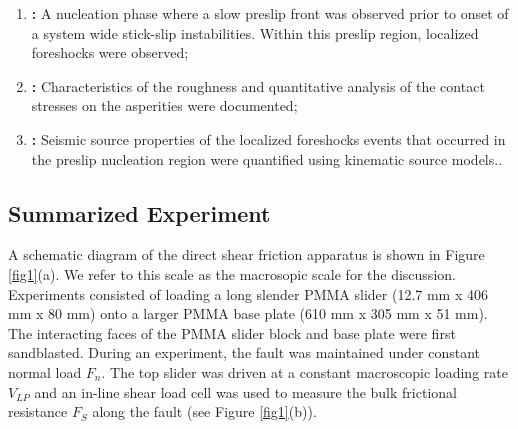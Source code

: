 \documentclass[preprint,1p, 10pt,authoryear]{elsarticle}
\begin{document}
\begin{enumerate}
\item \textbf{\citet{Selvadurai2015}: } A nucleation phase where a slow preslip front was observed prior to onset of a system wide stick-slip instabilities. Within this preslip region, localized foreshocks were observed;
\item \textbf{\citet{Selvadurai2017}:} Characteristics of the roughness and quantitative analysis of the contact stresses on the asperities were documented;
\item \textbf{\citet{Selvadurai2019}: }Seismic source properties of the localized foreshocks events that occurred in the preslip nucleation region were quantified using kinematic source models..
\end{enumerate}

\subsection{Summarized Experiment}
\label{GeneralExp}
A schematic diagram of the direct shear friction apparatus is shown in Figure \ref{fig1}(a). We refer to this scale as the macrosopic scale for the discussion. Experiments consisted of loading a long slender PMMA slider (12.7 mm x 406 mm x 80 mm) onto a larger PMMA base plate (610 mm x 305 mm x 51 mm). The interacting faces of the PMMA slider block and base plate were first sandblasted. During an experiment, the fault was maintained under constant normal load $F_{n}$.  The top slider was driven at a constant macroscopic loading rate $V_{LP}$ and an in-line shear load cell was used to measure the bulk frictional resistance $F_{S}$ along the fault (see Figure \ref{fig1}(b)).   
  
\end{document}

